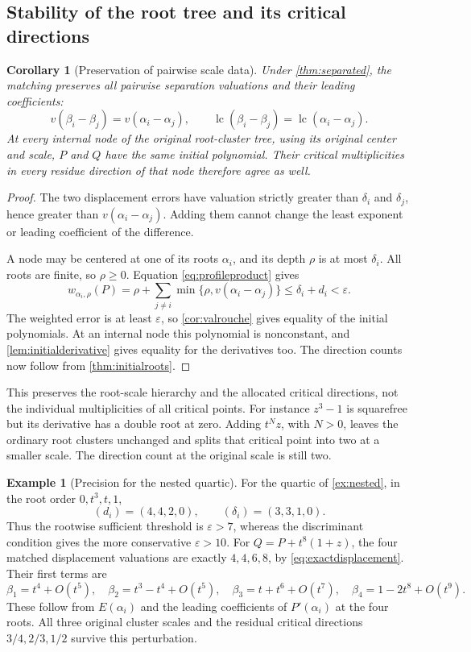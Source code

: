\documentclass[11pt,letterpaper]{article}
\numberwithin{equation}{section}
\newtheorem{corollary}[theorem]{Corollary}
\theoremstyle{definition}
\newtheorem{example}[theorem]{Example}
\theoremstyle{remark}\newtheorem{remark}[theorem]{Remark}
\newcommand{\lc}{\operatorname{lc}}
\begin{document}
\subsection{Stability of the root tree and its critical directions}
\begin{corollary}[Preservation of pairwise scale data]\label{cor:treestability}
Under \cref{thm:separated}, the matching preserves all pairwise
separation valuations and their leading coefficients:
\[
 v(\beta_i-\beta_j)=v(\alpha_i-\alpha_j),\qquad
 \lc(\beta_i-\beta_j)=\lc(\alpha_i-\alpha_j).
\]
At every internal node of the original root-cluster tree, using its
original center and scale, $P$ and $Q$ have the same initial polynomial.
Their critical multiplicities in every residue direction of that node
therefore agree as well.
\end{corollary}
\begin{proof}
The two displacement errors have valuation strictly greater than
$\delta_i$ and $\delta_j$, hence greater than
$v(\alpha_i-\alpha_j)$. Adding them cannot change the least exponent
or leading coefficient of the difference.

A node may be centered at one of its roots $\alpha_i$, and its depth
$\rho$ is at most $\delta_i$. All roots are finite, so $\rho\ge0$.
Equation \eqref{eq:profileproduct} gives
\[
 w_{\alpha_i,\rho}(P)=\rho+\sum_{j\ne i}
                  \min\{\rho,v(\alpha_i-\alpha_j)\}
 \le\delta_i+d_i<\varepsilon.
\]
The weighted error is at least $\varepsilon$, so
\cref{cor:valrouche} gives equality of the initial polynomials.
At an internal node this polynomial is nonconstant, and
\cref{lem:initialderivative} gives equality for the derivatives too.
The direction counts now follow from \cref{thm:initialroots}.
\end{proof}
This preserves the root-scale hierarchy and the allocated critical
directions, not the individual multiplicities of all critical points.
For instance $z^3-1$ is squarefree but its derivative has a double
root at zero. Adding $t^Nz$, with $N>0$, leaves the ordinary root
clusters unchanged and splits that critical point into two at a
smaller scale. The direction count at the original scale is still two.

\begin{example}[Precision for the nested quartic]\label{ex:quarticperturb}
For the quartic of \cref{ex:nested}, in the root order $0,t^3,t,1$,
\[
 (d_i)=(4,4,2,0),\qquad (\delta_i)=(3,3,1,0).
\]
Thus the rootwise sufficient threshold is $\varepsilon>7$, whereas
the discriminant condition gives the more conservative $\varepsilon>10$.
For $Q=P+t^8(1+z)$, the four matched displacement valuations are exactly
$4,4,6,8$, by \eqref{eq:exactdisplacement}. Their first terms are
\[
 \beta_1=t^4+O(t^5),\quad
 \beta_2=t^3-t^4+O(t^5),\quad
 \beta_3=t+t^6+O(t^7),\quad
 \beta_4=1-2t^8+O(t^9).
\]
These follow from $E(\alpha_i)$ and the leading coefficients of
$P'(\alpha_i)$ at the four roots.
All three original cluster scales and the residual critical directions
$3/4,2/3,1/2$ survive this perturbation.
\end{example}
\end{document}
